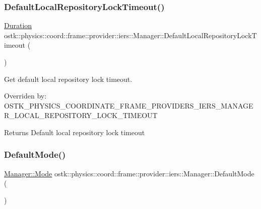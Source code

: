 \subsubsection{\texorpdfstring{Default\+Local\+Repository\+Lock\+Timeout()}{DefaultLocalRepositoryLockTimeout()}}
{\footnotesize\ttfamily \hyperlink{classostk_1_1physics_1_1time_1_1_duration}{Duration} ostk\+::physics\+::coord\+::frame\+::provider\+::iers\+::\+Manager\+::\+Default\+Local\+Repository\+Lock\+Timeout (\begin{DoxyParamCaption}{ }\end{DoxyParamCaption})\hspace{0.3cm}{\ttfamily [static]}}



Get default local repository lock timeout. 

Overriden by\+: O\+S\+T\+K\+\_\+\+P\+H\+Y\+S\+I\+C\+S\+\_\+\+C\+O\+O\+R\+D\+I\+N\+A\+T\+E\+\_\+\+F\+R\+A\+M\+E\+\_\+\+P\+R\+O\+V\+I\+D\+E\+R\+S\+\_\+\+I\+E\+R\+S\+\_\+\+M\+A\+N\+A\+G\+E\+R\+\_\+\+L\+O\+C\+A\+L\+\_\+\+R\+E\+P\+O\+S\+I\+T\+O\+R\+Y\+\_\+\+L\+O\+C\+K\+\_\+\+T\+I\+M\+E\+O\+UT

\begin{DoxyReturn}{Returns}
Default local repository lock timeout 
\end{DoxyReturn}
\mbox{\label{classostk_1_1physics_1_1coord_1_1frame_1_1provider_1_1iers_1_1_manager_a0a1975c6e7c3990f6a4f679415f4065e}} 
\subsubsection{\texorpdfstring{Default\+Mode()}{DefaultMode()}}
{\footnotesize\ttfamily \hyperlink{classostk_1_1physics_1_1coord_1_1frame_1_1provider_1_1iers_1_1_manager_a3a8dd1081d1094069417687b4a3f16ba}{Manager\+::\+Mode} ostk\+::physics\+::coord\+::frame\+::provider\+::iers\+::\+Manager\+::\+Default\+Mode (\begin{DoxyParamCaption}{ }\end{DoxyParamCaption})\hspace{0.3cm}{\ttfamily [static]}}



